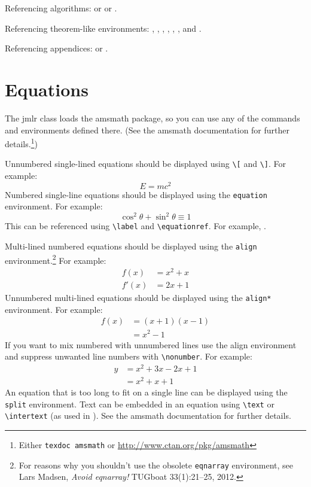 \documentclass[pmlr]{jmlr}%
\begin{document}
Referencing algorithms:  or
 or
.

Referencing theorem-like environments: ,
, , 
, ,
,  and
.

Referencing appendices:  or
.

\section{Equations}
\label{sec:math}

The \textsf{jmlr} class loads the \textsf{amsmath} package, so
you can use any of the commands and environments defined there.
(See the \textsf{amsmath} documentation for further
details.\footnote{Either \texttt{texdoc amsmath} or
\url{http://www.ctan.org/pkg/amsmath}})

Unnumbered single-lined equations should be displayed using
\verb|\[| and \verb|\]|. For example:
\[E = m c^2\]
Numbered single-line equations should be displayed using the
\texttt{equation} environment. For example:
\begin{equation}\label{eq:trigrule}
\cos^2\theta + \sin^2\theta \equiv 1
\end{equation}
This can be referenced using \verb|\label| and \verb|\equationref|.
For example, .

Multi-lined numbered equations should be displayed using the
\texttt{align} environment.\footnote{For reasons why you 
shouldn't use the obsolete \texttt{eqnarray} environment, see
Lars Madsen, \emph{Avoid eqnarray!} TUGboat 33(1):21--25, 2012.} For example:
\begin{align}
f(x) &= x^2 + x\label{eq:f}\\
f'(x) &= 2x + 1\label{eq:df}
\end{align}
Unnumbered multi-lined equations should be displayed using the
\texttt{align*} environment. For example:
\begin{align*}
f(x) &= (x+1)(x-1)\\
&= x^2 - 1
\end{align*}
If you want to mix numbered with unnumbered lines use the
align environment and suppress unwanted line numbers with
\verb|\nonumber|. For example:
\begin{align}
y &= x^2 + 3x - 2x + 1\nonumber\\
&= x^2 + x + 1\label{eq:y}
\end{align}
An equation that is too long to fit on a single line can be
displayed using the \texttt{split} environment. 
Text can be embedded in an equation using \verb|\text| or
\verb|\intertext| (as used in ).
See the \textsf{amsmath} documentation for further details.
\end{document}
